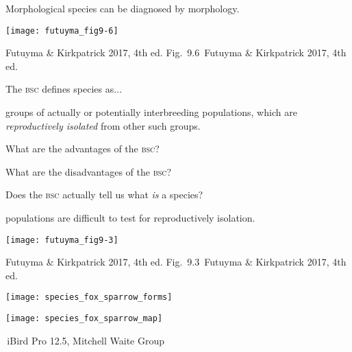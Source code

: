 \documentclass[t]{beamer}
\newcommand{\futuyma}[1]{%
	\ifthenelse{\isempty{#1}}%
	{Futuyma \& Kirkpatrick 2017, 4th ed.}%
	{Fig.~#1~Futuyma \& Kirkpatrick 2017, 4th ed.}%
}
\newcommand{\backskip}{\vspace{-0.5\baselineskip}}
\begin{document}

\begin{frame}{Morphological species can be diagnosed by morphology.}

\backskip

\texttt{[image: futuyma\_fig9-6]}

\tinyfill \futuyma{9.6}

\end{frame}

\begin{frame}{The \textsc{bsc} defines species as$\dots$}

\vspace{-\baselineskip}

\hangpara groups of actually or potentially interbreeding populations, which are \emph{reproductively isolated} from other such groups.

\hangpara What are the advantages of the \textsc{bsc?}

\hangpara What are the disadvantages of the \textsc{bsc?}

\hangpara Does the \textsc{bsc} actually tell us what \emph{is} a species?

\end{frame}


\begin{frame}[t]{ populations are difficult to test for reproductively isolation.}

\backskip
\centering

\texttt{[image: futuyma\_fig9-3]}

\tinyfill \futuyma{9.3}

\end{frame}

\begin{frame}

\backskip

\begin{multicols}{2}

\centering
\noindent \texttt{[image: species\_fox\_sparrow\_forms]}

\columnbreak

\centering
\noindent\texttt{[image: species\_fox\_sparrow\_map]}

\end{multicols}

\tinyfill\textcopyright\,iBird Pro 12.5, Mitchell Waite Group

\end{frame}
\end{document}
